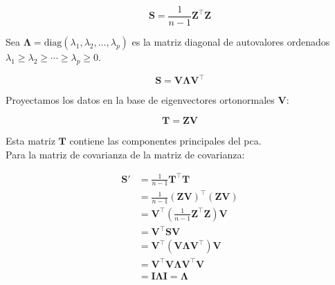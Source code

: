 \documentclass{article}
\begin{document}
\[
\mathbf{S} = \frac{1}{n-1} \mathbf{Z}^\top \mathbf{Z}
\]

Sea \( \mathbf{\Lambda} = \mathrm{diag}(\lambda_1, \lambda_2, \dots, \lambda_p) \) es la matriz diagonal de autovalores ordenados \( \lambda_1 \geq \lambda_2 \geq \cdots \geq \lambda_p \geq 0 \).

\[
\mathbf{S} = \mathbf{V} \mathbf{\Lambda} \mathbf{V}^\top
\]



Proyectamos los datos en la base de eigenvectores ortonormales \( \mathbf{V} \):

\[
\mathbf{T} = \mathbf{Z} \mathbf{V}
\]

Esta matriz \( \mathbf{T} \) contiene las componentes principales del pca.\\

Para la matriz de covarianza de la matriz de covarianza:


\begin{align*}
\mathbf{S}' &= \frac{1}{n-1} \mathbf{T}^\top \mathbf{T} \\
            &= \frac{1}{n-1} (\mathbf{Z} \mathbf{V})^\top (\mathbf{Z} \mathbf{V}) \\
            &= \mathbf{V}^\top \left( \frac{1}{n-1} \mathbf{Z}^\top \mathbf{Z} \right) \mathbf{V} \\
            &= \mathbf{V}^\top \mathbf{S} \mathbf{V} \\
            &= \mathbf{V}^\top (\mathbf{V} \mathbf{\Lambda} \mathbf{V}^\top) \mathbf{V} \\
            &= \mathbf{V}^\top \mathbf{V} \mathbf{\Lambda} \mathbf{V}^\top \mathbf{V} \\
            &= \mathbf{I} \mathbf{\Lambda} \mathbf{I} = \mathbf{\Lambda}
\end{align*}
\end{document}
